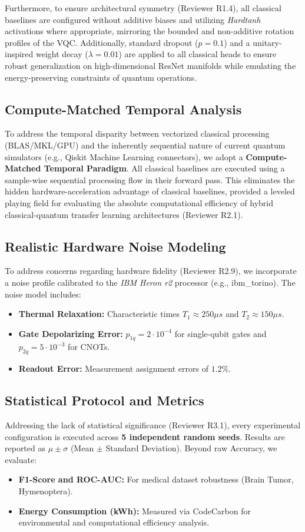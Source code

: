 Furthermore, to ensure architectural symmetry (Reviewer R1.4), all classical baselines are configured without additive biases and utilizing \textit{Hardtanh} activations where appropriate, mirroring the bounded and non-additive rotation profiles of the VQC. Additionally, standard dropout ($p=0.1$) and a unitary-inspired weight decay ($\lambda=0.01$) are applied to all classical heads to ensure robust generalization on high-dimensional ResNet manifolds while emulating the energy-preserving constraints of quantum operations.

\subsection{Compute-Matched Temporal Analysis}
To address the temporal disparity between vectorized classical processing (BLAS/MKL/GPU) and the inherently sequential nature of current quantum simulators (e.g., Qiskit Machine Learning connectors), we adopt a \textbf{Compute-Matched Temporal Paradigm}. All classical baselines are executed using a sample-wise sequential processing flow in their forward pass. This eliminates the hidden hardware-acceleration advantage of classical baselines, provided a leveled playing field for evaluating the absolute computational efficiency of hybrid classical-quantum transfer learning architectures (Reviewer R2.1).

\subsection{Realistic Hardware Noise Modeling}
To address concerns regarding hardware fidelity (Reviewer R2.9), we incorporate a noise profile calibrated to the \textit{IBM Heron r2} processor (e.g., ibm_torino). The noise model includes:
\begin{itemize}
    \item \textbf{Thermal Relaxation:} Characteristic times $T_1 \approx 250\mu s$ and $T_2 \approx 150\mu s$.
    \item \textbf{Gate Depolarizing Error:} $p_{1q} = 2 \cdot 10^{-4}$ for single-qubit gates and $p_{2q} = 5 \cdot 10^{-3}$ for CNOTs.
    \item \textbf{Readout Error:} Measurement assignment errors of $1.2\%$.
\end{itemize}

\subsection{Statistical Protocol and Metrics}
Addressing the lack of statistical significance (Reviewer R3.1), every experimental configuration is executed across \textbf{5 independent random seeds}. Results are reported as $\mu \pm \sigma$ (Mean $\pm$ Standard Deviation). Beyond raw Accuracy, we evaluate:
\begin{itemize}
    \item \textbf{F1-Score and ROC-AUC:} For medical dataset robustness (Brain Tumor, Hymenoptera).
    \item \textbf{Energy Consumption (kWh):} Measured via CodeCarbon for environmental and computational efficiency analysis.
\end{itemize}

